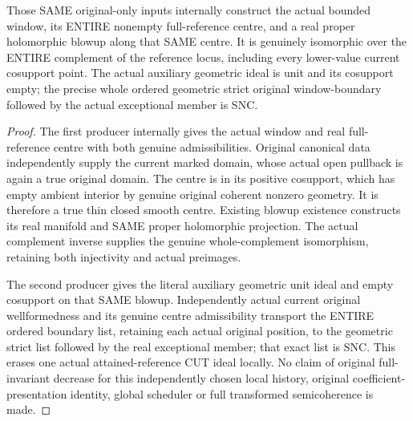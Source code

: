 \begin{theorem}
\label{hir:original-full-reference-original-only-local-unit-blowup}
\leanok
{}
Those SAME original-only inputs internally construct the actual bounded
window, its ENTIRE nonempty full-reference centre, and a real proper
holomorphic blowup along that SAME centre. It is genuinely isomorphic over
the ENTIRE complement of the reference locus, including every lower-value
current cosupport point. The actual auxiliary geometric ideal is unit and
its cosupport empty; the precise whole ordered geometric strict original
window-boundary followed by the actual exceptional member is SNC.
\end{theorem}
\begin{proof}
The first producer internally gives the actual window and real full-reference
centre with both genuine admissibilities. Original canonical data independently
supply the current marked domain, whose actual open pullback is again a
true original domain. The centre is in its positive cosupport, which has
empty ambient interior by genuine original coherent nonzero geometry.
It is therefore a true thin closed smooth centre. Existing blowup existence
constructs its real manifold and SAME proper holomorphic projection.
The actual complement inverse supplies the genuine whole-complement
isomorphism, retaining both injectivity and actual preimages.

The second producer gives the literal auxiliary geometric unit ideal and
empty cosupport on that SAME blowup. Independently actual current original
wellformedness and its genuine centre admissibility transport the ENTIRE
ordered boundary list, retaining each actual original position, to the
geometric strict list followed by the real exceptional member; that exact
list is SNC. This erases one actual attained-reference CUT ideal locally.
No claim of original full-invariant decrease for this independently chosen
local history, original coefficient-presentation identity, global scheduler
or full transformed semicoherence is made.
\end{proof}
